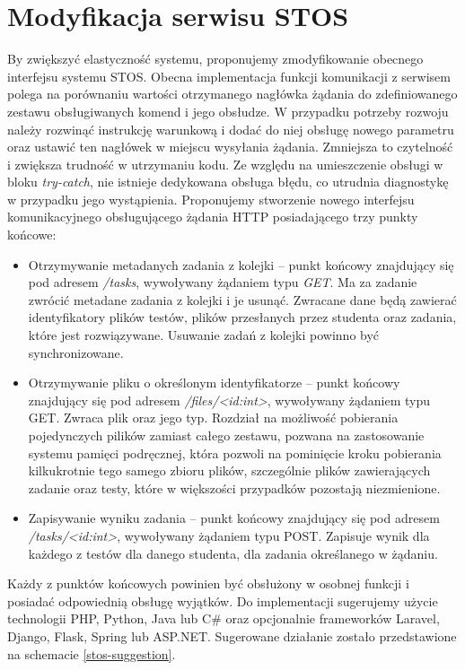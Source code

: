 \section{Modyfikacja serwisu STOS}
By zwiększyć elastyczność systemu, proponujemy zmodyfikowanie obecnego interfejsu systemu STOS. Obecna implementacja funkcji komunikacji z serwisem polega na porównaniu wartości otrzymanego nagłówka żądania do zdefiniowanego zestawu obsługiwanych komend i jego obsłudze. W przypadku potrzeby rozwoju należy rozwinąć instrukcję warunkową i dodać do niej obsługę nowego parametru oraz ustawić ten nagłówek w miejscu wysyłania żądania. Zmniejsza to czytelność i zwiększa trudność w utrzymaniu kodu. Ze względu na umieszczenie obsługi w bloku \textit{try-catch}, nie istnieje dedykowana obsługa błędu, co utrudnia diagnostykę w przypadku jego wystąpienia. Proponujemy stworzenie nowego interfejsu komunikacyjnego obsługującego żądania HTTP posiadającego trzy punkty końcowe:
\begin{itemize}
    \item Otrzymywanie metadanych zadania z kolejki -- punkt końcowy znajdujący się pod adresem \textit{/tasks}, wywoływany żądaniem typu \textit{GET}. Ma za zadanie zwrócić metadane zadania z kolejki i je usunąć. Zwracane dane będą zawierać identyfikatory plików testów, plików przesłanych przez studenta oraz zadania, które jest rozwiązywane. Usuwanie zadań z kolejki powinno być synchronizowane.
    \item Otrzymywanie pliku o określonym identyfikatorze -- punkt końcowy znajdujący się pod adresem \textit{/files/<id:int>}, wywoływany żądaniem typu GET. Zwraca plik oraz jego typ. Rozdział na możliwość pobierania pojedynczych pilików zamiast całego zestawu, pozwana na zastosowanie systemu pamięci podręcznej, która pozwoli na pominięcie kroku pobierania kilkukrotnie tego samego zbioru plików, szczególnie plików zawierających zadanie oraz testy, które w większości przypadków pozostają niezmienione.
    \item Zapisywanie wyniku zadania -- punkt końcowy znajdujący się pod adresem \textit{/tasks/<id:int>}, wywoływany żądaniem typu POST. Zapisuje wynik dla każdego z testów dla danego studenta, dla zadania określanego w żądaniu.
\end{itemize}
\indent Każdy z punktów końcowych powinien być obsłużony w osobnej funkcji i posiadać odpowiednią obsługę wyjątków. Do implementacji sugerujemy użycie technologii PHP, Python, Java lub C\# oraz opcjonalnie frameworków Laravel, Django, Flask, Spring lub ASP.NET. Sugerowane działanie zostało przedstawione na schemacie \ref{stos-suggestion}.
